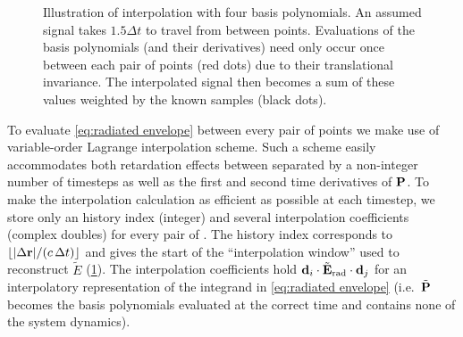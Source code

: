 \begin{figure}
  
  \caption{\label{fig:interpolation}Illustration of interpolation with four basis polynomials.
    An assumed signal takes $1.5\Delta t$ to travel from between points.
    Evaluations of the basis polynomials (and their derivatives) need only occur once between each pair of points (red dots) due to their translational invariance.
    The interpolated signal then becomes a sum of these values weighted by the known samples (black dots).
  }
\end{figure}

To evaluate \cref{eq:radiated envelope} between every pair of points we make use of variable-order Lagrange interpolation scheme.
Such a scheme easily accommodates both retardation effects between \qds{} separated by a non-integer number of timesteps as well as the first and second time derivatives of $\vb{P}$.
To make the interpolation calculation as efficient as possible at each timestep, we store only an history index (integer) and several interpolation coefficients (complex doubles) for every pair of \qds{}.
The history index corresponds to $\lfloor \abs{\Delta \vb{r}}/(c \, \Delta t) \rfloor$ and gives the start of the ``interpolation window'' used to reconstruct $\tilde{E}$ (\cref{fig:interpolation}).
The interpolation coefficients hold $\vb{d}_i \cdot \tilde{\vb{E}}_\text{rad} \cdot \vb{d}_j$ for an interpolatory representation of the integrand in \cref{eq:radiated envelope} (i.e.\ $\tilde{\vb{P}}$ becomes the basis polynomials evaluated at the correct time and contains none of the system dynamics).
